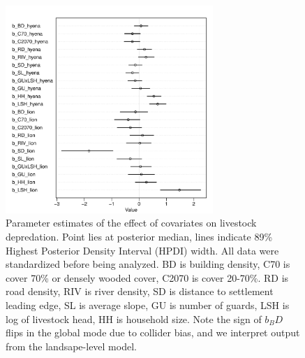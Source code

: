 \documentclass[12pt,]{article}
\begin{document}
\begin{figure}[H]
    \centering
    \includegraphics[width=0.7\textwidth]{Figures/livestock_conflict_species_parameter_dotplots.pdf} %
    \caption{Parameter estimates of the effect of covariates on livestock depredation.  Point lies at posterior median, lines indicate 89\% Highest Posterior Density Interval (HPDI) width. All data were standardized before being analyzed. BD is building density, C70 is cover 70\% or densely wooded cover, C2070 is cover 20-70\%. RD is road density, RIV is river density, SD is distance to settlement leading edge, SL is average slope, GU is number of guards, LSH is log of livestock head, HH is household size. Note the sign of $b_BD$ flips in the global mode due to collider bias, and we interpret output from the landsape-level model.}
    \label{fig:livestockmodeldot}
\end{figure}
\end{document}
